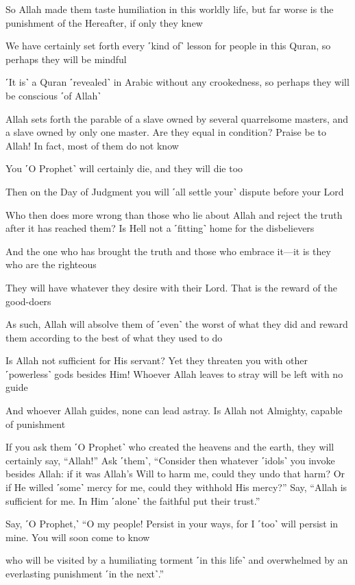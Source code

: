 So Allah made them taste humiliation in this worldly life, but far worse is the punishment of the Hereafter, if only they knew

We have certainly set forth every ˹kind of˺ lesson for people in this Quran, so perhaps they will be mindful

˹It is˺ a Quran ˹revealed˺ in Arabic without any crookedness, so perhaps they will be conscious ˹of Allah˺

Allah sets forth the parable of a slave owned by several quarrelsome masters, and a slave owned by only one master. Are they equal in condition? Praise be to Allah! In fact, most of them do not know

You ˹O Prophet˺ will certainly die, and they will die too

Then on the Day of Judgment you will ˹all settle your˺ dispute before your Lord

Who then does more wrong than those who lie about Allah and reject the truth after it has reached them? Is Hell not a ˹fitting˺ home for the disbelievers

And the one who has brought the truth and those who embrace it—it is they who are the righteous

They will have whatever they desire with their Lord. That is the reward of the good-doers

As such, Allah will absolve them of ˹even˺ the worst of what they did and reward them according to the best of what they used to do

Is Allah not sufficient for His servant? Yet they threaten you with other ˹powerless˺ gods besides Him! Whoever Allah leaves to stray will be left with no guide

And whoever Allah guides, none can lead astray. Is Allah not Almighty, capable of punishment

If you ask them ˹O Prophet˺ who created the heavens and the earth, they will certainly say, “Allah!” Ask ˹them˺, “Consider then whatever ˹idols˺ you invoke besides Allah: if it was Allah’s Will to harm me, could they undo that harm? Or if He willed ˹some˺ mercy for me, could they withhold His mercy?” Say, “Allah is sufficient for me. In Him ˹alone˺ the faithful put their trust.”

Say, ˹O Prophet,˺ “O my people! Persist in your ways, for I ˹too˺ will persist in mine. You will soon come to know

who will be visited by a humiliating torment ˹in this life˺ and overwhelmed by an everlasting punishment ˹in the next˺.”


